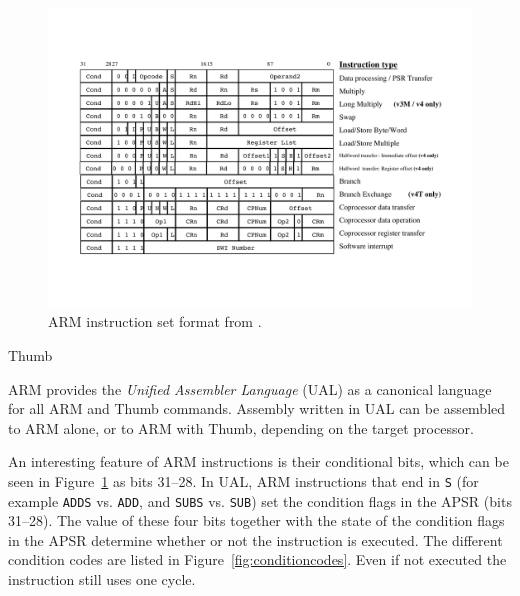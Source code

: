 \documentclass[oneside,a4paper]{report}
\begin{document}
\begin{figure}[htbp]
	\centering
	\includegraphics[width=1.0\textwidth]{./fig/InstructionFormat.pdf}
	\caption{ARM instruction set format from \cite[p. 13]{ARMInst}.}
	\label{fig:instructionformat}
\end{figure}

Thumb

ARM provides the \emph{Unified Assembler Language} (UAL) as a canonical language for all ARM and Thumb commands. Assembly written in UAL can be assembled to ARM alone, or to ARM with Thumb, depending on the target processor.

An interesting feature of ARM instructions is their conditional bits, which can be seen in Figure~\ref{fig:instructionformat} as bits 31--28. In UAL, ARM instructions that end in \texttt{S} (for example \texttt{ADDS} vs. \texttt{ADD}, and \texttt{SUBS} vs. \texttt{SUB}) set the condition flags in the APSR (bits 31--28). The value of these four bits together with the state of the condition flags in the APSR determine whether or not the instruction is executed. The different condition codes are listed in Figure~\ref{fig:conditioncodes}. Even if not executed the instruction still uses one cycle.
\end{document}
